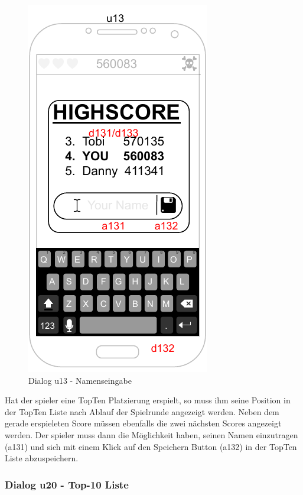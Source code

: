 \begin{figure}
    \begin{center}
    \includegraphics{diagramme/pdf/Mockup-u13.pdf}
\end{center}
    \caption{Dialog u13 - Namenseingabe}
\end{figure}

Hat der \gls{spieler} eine TopTen Platzierung erspielt, so muss ihm seine Position in der TopTen Liste nach Ablauf der Spielrunde angezeigt werden.
Neben dem gerade erspieleten Score müssen ebenfalls die zwei nächsten Scores angezeigt werden.
Der \gls{spieler} muss dann die Möglichkeit haben, seinen Namen einzutragen (a131) und sich mit einem Klick auf den Speichern Button (a132) in der TopTen Liste abzuspeichern.
\clearpage

\subsubsection{Dialog u20 - Top-10 Liste}

